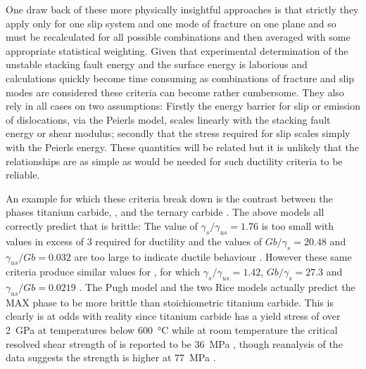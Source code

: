 One draw back of these more physically insightful approaches is that strictly they apply only for one slip system and one mode of fracture on one plane and so must be recalculated for all possible combinations and then averaged with some appropriate statistical weighting. Given that experimental determination of the unstable stacking fault energy and the surface energy is laborious and calculations quickly become time consuming as combinations of fracture and slip modes are considered these criteria can become rather cumbersome. They also rely in all cases on two assumptions: Firstly the energy barrier for slip or emission of dislocations, via the Peierls model, scales linearly with the stacking fault energy or shear modulus; secondly that the stress required for slip scales simply with the Peierls energy. These quantities will be related but it is unlikely that the relationships are as simple as would be needed for such ductility criteria to be reliable.

An example for which these criteria break down is the contrast between the phases titanium carbide, , and the ternary carbide . The above models all correctly predict that  is brittle: The value of $\gamma_s / \gamma_{us} = 1.76$ is too small with values in excess of 3 required for ductility \cite{Price1992,Yu2003} and the values of $Gb/\gamma_s = 20.48$ and $\gamma_{us} / Gb = 0.032$ are too large to indicate ductile behaviour \cite{Yu2003,Medvedeva2011}. However these same criteria produce similar values for , for which $\gamma_s / \gamma_{us} = 1.42$, $Gb/\gamma_s = 27.3$ and $\gamma_{us} / Gb = 0.0219$ \cite{Medvedeva2011,Farle2015}. The Pugh model and the two Rice models \cite{Pugh1954,rice1974,Rice1992} actually predict the MAX phase to be more brittle than stoichiometric titanium carbide. This is clearly is at odds with reality since titanium carbide has a yield stress of over \SI{2}{\giga\pascal} at temperatures below \SI{600}{\celsius} \cite{Miracle1983} while at room temperature the critical resolved shear strength of  is reported to be \SI{36}{\mega\pascal} \cite{Barsoum1999}, though reanalysis of the data suggests the strength is higher at \SI{77}{\mega\pascal} \cite{Humphrey2012}.


